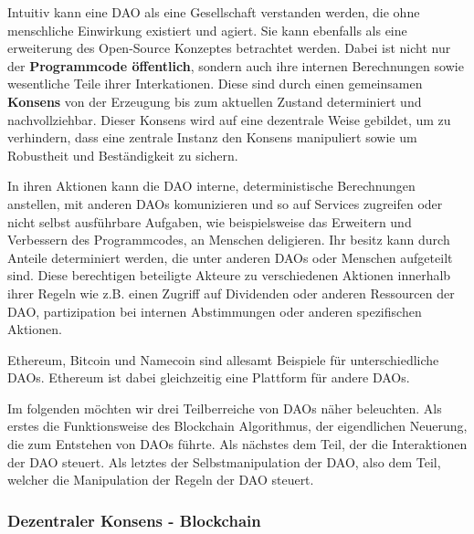 \documentclass[a4paper,12pt]{article}
\begin{document}
Intuitiv kann eine DAO als eine Gesellschaft verstanden werden, die ohne menschliche Einwirkung existiert und agiert. Sie kann ebenfalls als eine erweiterung des Open-Source Konzeptes betrachtet werden. Dabei ist nicht nur der \textbf{Programmcode öffentlich}, sondern auch ihre internen Berechnungen sowie wesentliche Teile ihrer Interkationen. Diese sind durch einen gemeinsamen \textbf{Konsens} von der Erzeugung bis zum aktuellen Zustand determiniert und nachvollziehbar. Dieser Konsens wird auf eine dezentrale Weise gebildet, um zu verhindern, dass eine zentrale Instanz den Konsens manipuliert sowie um Robustheit und Beständigkeit zu sichern.

In ihren Aktionen kann die DAO interne, deterministische Berechnungen anstellen, mit anderen DAOs komunizieren und so auf Services zugreifen oder nicht selbst ausführbare Aufgaben, wie beispielsweise das Erweitern und Verbessern des Programmcodes, an Menschen deligieren. Ihr besitz kann durch Anteile determiniert werden, die unter anderen DAOs oder Menschen aufgeteilt sind. Diese berechtigen beteiligte Akteure zu verschiedenen Aktionen innerhalb ihrer Regeln wie z.B. einen Zugriff auf Dividenden oder anderen Ressourcen der DAO, partizipation bei internen Abstimmungen oder anderen spezifischen Aktionen. 

Ethereum, Bitcoin und Namecoin sind allesamt Beispiele für unterschiedliche DAOs. Ethereum ist dabei gleichzeitig eine Plattform für andere DAOs.

Im folgenden möchten wir drei Teilberreiche von DAOs näher beleuchten. Als erstes die Funktionsweise des Blockchain Algorithmus, der eigendlichen Neuerung, die zum Entstehen von DAOs führte. Als nächstes dem Teil, der die Interaktionen der DAO steuert. Als letztes der Selbstmanipulation der DAO, also dem Teil, welcher die Manipulation der Regeln der DAO steuert.


\subsubsection*{Dezentraler Konsens - Blockchain}
\end{document}
